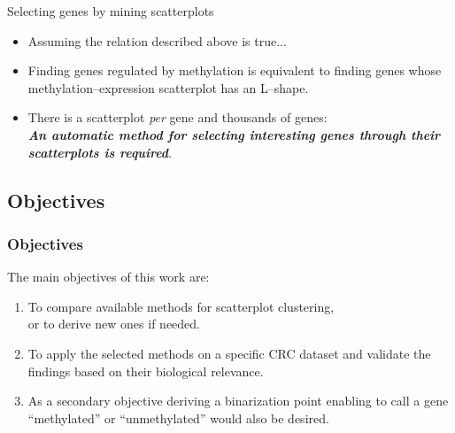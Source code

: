 \documentclass[handout]{beamer}
\begin{document}
\begin{frame}{Selecting genes by mining scatterplots}
  \begin{itemize}
  \item Assuming the relation described above is true...
\item Finding genes regulated by methylation is equivalent to finding genes whose methylation--expression scatterplot has an L--shape.
\item There is a scatterplot \emph{per} gene and thousands of genes:\\ \textbf{\emph{An automatic method for selecting interesting genes through their scatterplots is required}}.
  \end{itemize}
\end{frame}


\subsection{Objectives}

\begin{frame}[fragile]\frametitle{Objectives}
The main objectives of this work are:
\begin{enumerate}
\item To compare available methods  for scatterplot clustering, \\ or to derive new ones if needed.
\item To apply the selected methods on a specific CRC dataset and validate the findings based on their biological relevance.
\item As a secondary objective deriving a binarization point enabling to call a gene ``methylated'' or ``unmethylated'' would also be desired.
\end{enumerate}

\end{frame}
\end{document}
